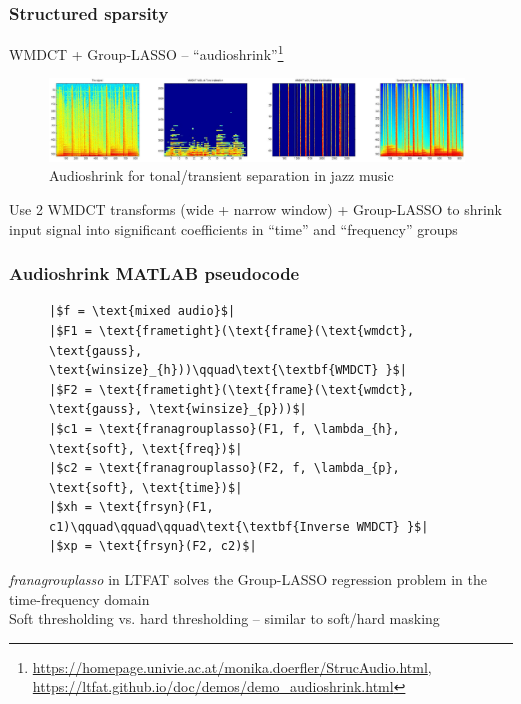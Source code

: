 \documentclass{beamer}
\newlength{\mintednumbersep}
\begin{document}
\begin{frame}
	\frametitle{Structured sparsity}
	WMDCT + Group-LASSO -- ``audioshrink''\footnote{\url{https://homepage.univie.ac.at/monika.doerfler/StrucAudio.html}, \url{https://ltfat.github.io/doc/demos/demo_audioshrink.html}}
	\begin{figure}[ht]
		\vspace{-0.5em}
		\includegraphics[width=11cm]{./wmdctjazz.png}
		\caption{Audioshrink for tonal/transient separation in jazz music}
		\vspace{-0.5em}
	\end{figure}
	Use 2 WMDCT transforms (wide + narrow window) + Group-LASSO to shrink input signal into significant coefficients in ``time'' and ``frequency'' groups
\end{frame}

\begin{frame}[fragile]
	\frametitle{Audioshrink MATLAB pseudocode}
\begin{figure}[h]
  \centering
  \centering
\begin{verbatim}
|$f = \text{mixed audio}$|
|$F1 = \text{frametight}(\text{frame}(\text{wmdct}, \text{gauss}, \text{winsize}_{h}))\qquad\text{\textbf{WMDCT} }$|
|$F2 = \text{frametight}(\text{frame}(\text{wmdct}, \text{gauss}, \text{winsize}_{p}))$|
|$c1 = \text{franagrouplasso}(F1, f, \lambda_{h}, \text{soft}, \text{freq})$|
|$c2 = \text{franagrouplasso}(F2, f, \lambda_{p}, \text{soft}, \text{time})$|
|$xh = \text{frsyn}(F1, c1)\qquad\qquad\qquad\text{\textbf{Inverse WMDCT} }$|
|$xp = \text{frsyn}(F2, c2)$|
\end{verbatim}
\end{figure}
\textit{franagrouplasso} in LTFAT solves the Group-LASSO regression problem in the time-frequency domain\\
Soft thresholding vs. hard thresholding -- similar to soft/hard masking
\end{frame}
\end{document}
